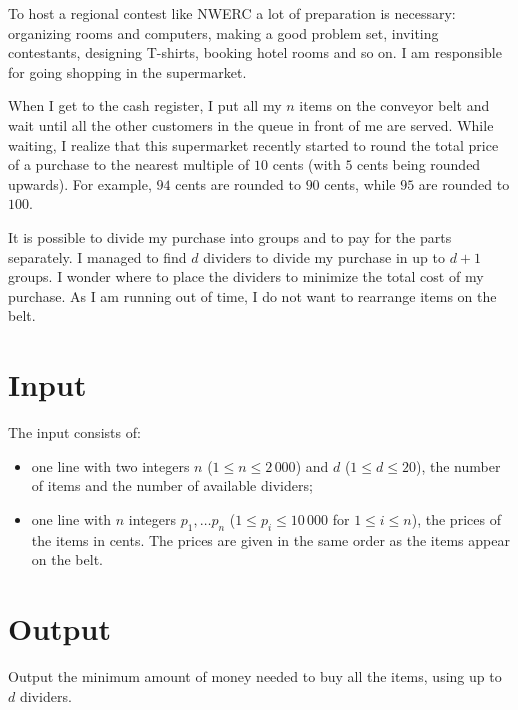 
%
\noindent
To host a regional contest like NWERC a lot of preparation is necessary:
organizing rooms and computers, making a good problem set, inviting
contestants, designing T-shirts, booking hotel rooms and so on. I am
responsible for going shopping in the supermarket.

When I get to the cash register, I put all my $n$ items on the conveyor belt
and wait until all the other customers in the queue in front of me are served.
While waiting, I realize that this supermarket recently started to round the
total price of a purchase to the nearest multiple of $10$ cents (with $5$ cents
being rounded upwards). For example, $94$ cents are rounded to $90$ cents,
while $95$ are rounded to $100$.

It is possible to divide my purchase into groups and to pay for the parts
separately. I managed to find $d$ dividers to divide my purchase in up to $d+1$
groups. I wonder where to place the dividers to minimize the total cost of
my purchase.  As I am running out of time, I do not want to rearrange items on
the belt.

\section*{Input}

The input consists of:
\begin{itemize}
   \item one line with two integers $n$ ($1 \leq n \le 2\,000$) and $d$ ($1 \leq
d \le 20$), the
number of items and the number of available dividers;
   \item one line with $n$ integers $p_1, \ldots p_n$ ($1 \leq p_i \leq 10\,000$ for $1 \le i \le n$), the prices of
	   the items in cents. The prices are given in the same order as the items appear on the belt.
\end{itemize}

\section*{Output}

Output the minimum amount of money needed to buy all the items, using up to $d$ dividers.
